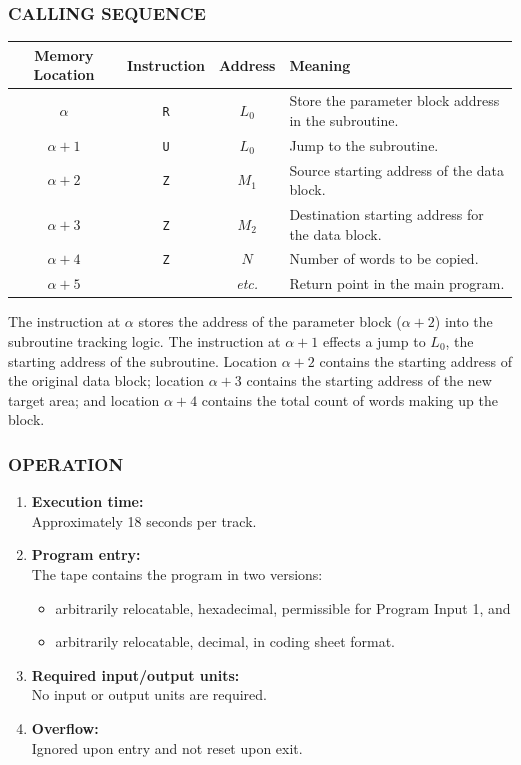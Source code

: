 \subsubsection*{CALLING SEQUENCE}
\begin{table}[h!]
\centering
\begin{tabularx}{\textwidth}{cccX}
\toprule
\textbf{Memory Location} & \textbf{Instruction} & \textbf{Address} & \textbf{Meaning} \\
\midrule
$\alpha$     & \texttt{R} & $L_0$                   & Store the parameter block address in the subroutine. \\
$\alpha+1$   & \texttt{U} & $L_0$                   & Jump to the subroutine. \\
$\alpha+2$   & \texttt{Z} & $M_1$                   & Source starting address of the data block. \\
$\alpha+3$   & \texttt{Z} & $M_2$                   & Destination starting address for the data block. \\
$\alpha+4$   & \texttt{Z} & $N$                     & Number of words to be copied. \\
$\alpha+5$   &            & \textit{etc.}           & Return point in the main program. \\
\bottomrule
\end{tabularx}
\end{table}

The instruction at $\alpha$ stores the address of the parameter block ($\alpha+2$) into the subroutine tracking logic. The instruction at $\alpha+1$ effects a jump to $L_0$, the starting address of the subroutine. Location $\alpha+2$ contains the starting address of the original data block; location $\alpha+3$ contains the starting address of the new target area; and location $\alpha+4$ contains the total count of words making up the block.

\subsubsection*{OPERATION}
\begin{enumerate}
    \item \textbf{Execution time:} \\
    Approximately 18 seconds per track.
    \item \textbf{Program entry:} \\
    The tape contains the program in two versions:
    \begin{itemize}
        \item[a)] arbitrarily relocatable, hexadecimal, permissible for Program Input 1, and
        \item[b)] arbitrarily relocatable, decimal, in coding sheet format.
    \end{itemize}
    \item \textbf{Required input/output units:} \\
    No input or output units are required.
    \item \textbf{Overflow:} \\
    Ignored upon entry and not reset upon exit.
\end{enumerate}
